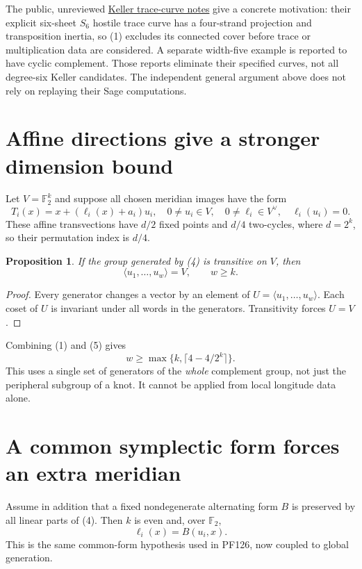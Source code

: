 \documentclass[11pt]{article}
\newtheorem{proposition}{Proposition}
\newcommand{\F}{\mathbb F}
\begin{document}
The public, unreviewed \href{https://github.com/alok/jacobian-two/blob/main/docs/s6-trace-curve-topology.md}{Keller trace-curve notes} give a concrete
motivation: their explicit six-sheet $S_6$ hostile trace curve has a
four-strand projection and transposition inertia, so (1) excludes its
connected cover before trace or multiplication data are considered.
A separate width-five example is reported to have cyclic complement.
Those reports eliminate their specified curves, not all degree-six
Keller candidates. The independent general argument above does not rely
on replaying their Sage computations.

\section{Affine directions give a stronger dimension bound}

Let $V=\F_2^k$ and suppose all chosen meridian images have the form
\[
 T_i(x)=x+(\ell_i(x)+a_i)u_i,\quad
 0\ne u_i\in V,\quad 0\ne\ell_i\in V^\vee,\quad\ell_i(u_i)=0.
                                                               \tag{4}
\]
These affine transvections have $d/2$ fixed points and $d/4$ two-cycles,
where $d=2^k$, so their permutation index is $d/4$.

\begin{proposition}
If the group generated by (4) is transitive on $V$, then
\[
              \langle u_1,\ldots,u_w\rangle=V,
              \qquad w\ge k.                                  \tag{5}
\]
\end{proposition}
\begin{proof}
Every generator changes a vector by an element of
$U=\langle u_1,\ldots,u_w\rangle$. Each coset of $U$ is invariant under
all words in the generators. Transitivity forces $U=V$.
\end{proof}

Combining (1) and (5) gives
\[
         w\ge\max\{k,\lceil4-4/2^k\rceil\}.                     \tag{6}
\]
This uses a single set of generators of the \emph{whole} complement group,
not just the peripheral subgroup of a knot. It cannot be applied from
local longitude data alone.

\section{A common symplectic form forces an extra meridian}

Assume in addition that a fixed nondegenerate alternating form $B$ is
preserved by all linear parts of (4). Then $k$ is even and, over $\F_2$,
\[
              \ell_i(x)=B(u_i,x).
\]
This is the same common-form hypothesis used in PF126, now coupled to
global generation.
\end{document}

